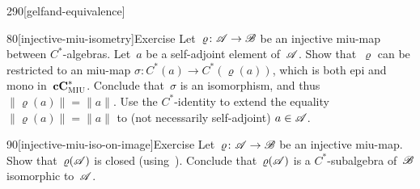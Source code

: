 \begin{parsec}{290}[gelfand-equivalence]
\begin{point}{80}[injective-miu-isometry]{Exercise}
Let~$\varrho\colon \mathscr{A}\to\mathscr{B}$
be an injective miu-map between $C^*$-algebras.
Let~$a$ be a self-adjoint element of~$\mathscr{A}$.
Show that~$\varrho$ can be restricted
to an miu-map $\sigma\colon C^*(a)\to C^*(\varrho(a))$,
which is both epi and mono in~$\mathbf{cC}^*_{\text{\textsc{MIU}}}$.
Conclude that~$\sigma$ is an isomorphism,
and thus~$\|\varrho(a)\|=\|a\|$.
Use the $C^*$-identity
to extend the equality $\|\varrho(a)\|=\|a\|$ 
to (not necessarily self-adjoint) $a\in \mathscr{A}$.
\end{point}
\begin{point}{90}[injective-miu-iso-on-image]{Exercise}%
Let~$\varrho\colon \mathscr{A}\to\mathscr{B}$ 
be an injective miu-map.
Show that~$\varrho(\mathscr{A})$
is closed (using~).
Conclude that~$\varrho(\mathscr{A})$
is a
 $C^*$-subalgebra of~$\mathscr{B}$
isomorphic to~$\mathscr{A}$.
\end{point}
\end{parsec}

